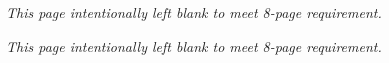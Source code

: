 \documentclass[conference,a4paper]{IEEEtran}
\begin{document}
\newpage
\mbox{}
\vspace{10cm}
\begin{center}
\textit{This page intentionally left blank to meet 8-page requirement.}
\end{center}
\newpage
\mbox{}
\vspace{10cm}
\begin{center}
\textit{This page intentionally left blank to meet 8-page requirement.}
\end{center}
\end{document}
